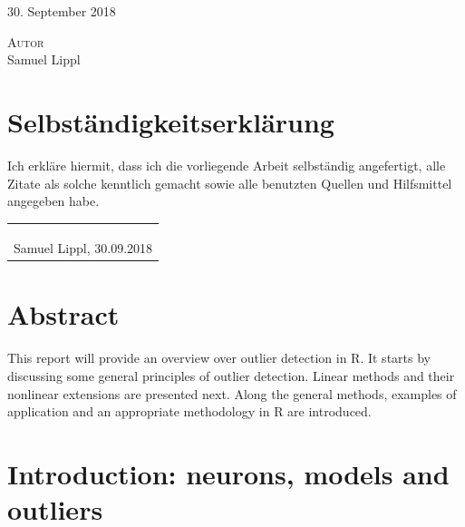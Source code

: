 \documentclass[]{report}
\theoremstyle{definition}
\theoremstyle{definition}
\theoremstyle{definition}
\theoremstyle{remark}
\begin{document}
\begin{titlepage}

\vfill


{\Large 30. September 2018}\\[1cm]
\begin{Large}
\textsc{Autor}\\Samuel Lippl
\end{Large}

\vfill

\end{titlepage}

\setcounter{page}{2}

\chapter*{Selbständigkeitserklärung}

Ich erkläre hiermit, dass ich die vorliegende Arbeit selbständig angefertigt, alle Zitate als solche kenntlich gemacht sowie alle benutzten Quellen und Hilfsmittel angegeben habe.\\

\begin{tabular}{c}
\\\\\\
\\\hline
Samuel Lippl, 30.09.2018
\end{tabular}

\hypertarget{abstract}{%
\chapter*{Abstract}\label{abstract}}


This report will provide an overview over outlier detection in R. It
starts by discussing some general principles of outlier detection.
Linear methods and their nonlinear extensions are presented next. Along
the general methods, examples of application and an appropriate
methodology in R are introduced.

\tableofcontents

\hypertarget{intro}{%
\chapter{Introduction: neurons, models and outliers}\label{intro}}
\end{document}
